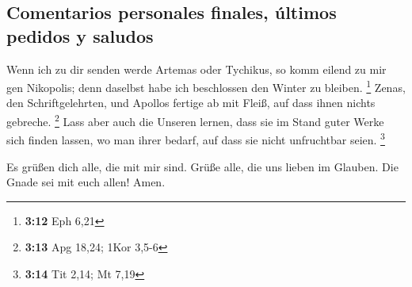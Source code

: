 \hypertarget{comentarios-personales-finales-uxfaltimos-pedidos-y-saludos}{%
\subsection{Comentarios personales finales, últimos pedidos y
saludos}\label{comentarios-personales-finales-uxfaltimos-pedidos-y-saludos}}

 Wenn ich zu dir senden werde Artemas oder Tychikus, so
komm eilend zu mir gen Nikopolis; denn daselbst habe ich beschlossen den
Winter zu bleiben. \footnote{\textbf{3:12} Eph 6,21} 
Zenas, den Schriftgelehrten, und Apollos fertige ab mit Fleiß, auf dass
ihnen nichts gebreche. \footnote{\textbf{3:13} Apg 18,24; 1Kor 3,5-6}
 Lass aber auch die Unseren lernen, dass sie im Stand
guter Werke sich finden lassen, wo man ihrer bedarf, auf dass sie nicht
unfruchtbar seien. \footnote{\textbf{3:14} Tit 2,14; Mt 7,19}

 Es grüßen dich alle, die mit mir sind. Grüße alle, die
uns lieben im Glauben. Die Gnade sei mit euch allen! Amen.
